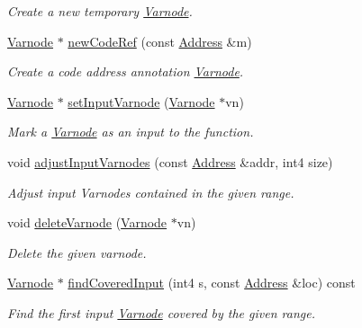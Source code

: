 \begin{DoxyCompactItemize}
\begin{DoxyCompactList}\small\item\em Create a new {\itshape temporary} \mbox{\hyperlink{class_varnode}{Varnode}}. \end{DoxyCompactList}\item 
\mbox{\hyperlink{class_varnode}{Varnode}} $\ast$ \mbox{\hyperlink{class_funcdata_a24e80f56ef371a0010a9e67ae8510086}{new\+Code\+Ref}} (const \mbox{\hyperlink{class_address}{Address}} \&m)
\begin{DoxyCompactList}\small\item\em Create a code address {\itshape annotation} \mbox{\hyperlink{class_varnode}{Varnode}}. \end{DoxyCompactList}\item 
\mbox{\hyperlink{class_varnode}{Varnode}} $\ast$ \mbox{\hyperlink{class_funcdata_a84a9880613a03f3aea65acf3dd1343d6}{set\+Input\+Varnode}} (\mbox{\hyperlink{class_varnode}{Varnode}} $\ast$vn)
\begin{DoxyCompactList}\small\item\em Mark a \mbox{\hyperlink{class_varnode}{Varnode}} as an input to the function. \end{DoxyCompactList}\item 
void \mbox{\hyperlink{class_funcdata_a35c51952540dbda3f11962b22c3064a3}{adjust\+Input\+Varnodes}} (const \mbox{\hyperlink{class_address}{Address}} \&addr, int4 size)
\begin{DoxyCompactList}\small\item\em Adjust input Varnodes contained in the given range. \end{DoxyCompactList}\item 
void \mbox{\hyperlink{class_funcdata_aa8657c4c04279316593adc6d2f389be5}{delete\+Varnode}} (\mbox{\hyperlink{class_varnode}{Varnode}} $\ast$vn)
\begin{DoxyCompactList}\small\item\em Delete the given varnode. \end{DoxyCompactList}\item 
\mbox{\hyperlink{class_varnode}{Varnode}} $\ast$ \mbox{\hyperlink{class_funcdata_a8fa3242779be4a766a37227deb728836}{find\+Covered\+Input}} (int4 s, const \mbox{\hyperlink{class_address}{Address}} \&loc) const
\begin{DoxyCompactList}\small\item\em Find the first input \mbox{\hyperlink{class_varnode}{Varnode}} covered by the given range. \end{DoxyCompactList}\item 

\end{DoxyCompactItemize}
